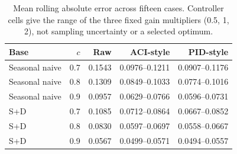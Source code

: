 \begin{table}[htbp]\centering\footnotesize
\caption{Mean rolling absolute error across fifteen cases. Controller cells give the range of the three fixed gain multipliers (0.5, 1, 2), not sampling uncertainty or a selected optimum.}
\label{tab:sensitivity}
\begin{tabular}{lrrrr}
\toprule
Base & $c$ & Raw & ACI-style & PID-style\\\midrule
Seasonal naive & 0.7 & 0.1543 & 0.0976--0.1211 & 0.0907--0.1176\\
Seasonal naive & 0.8 & 0.1309 & 0.0849--0.1033 & 0.0774--0.1016\\
Seasonal naive & 0.9 & 0.0957 & 0.0629--0.0766 & 0.0596--0.0731\\
S+D & 0.7 & 0.1085 & 0.0712--0.0864 & 0.0667--0.0852\\
S+D & 0.8 & 0.0830 & 0.0597--0.0697 & 0.0558--0.0667\\
S+D & 0.9 & 0.0567 & 0.0499--0.0571 & 0.0494--0.0557\\
\bottomrule\end{tabular}\end{table}
